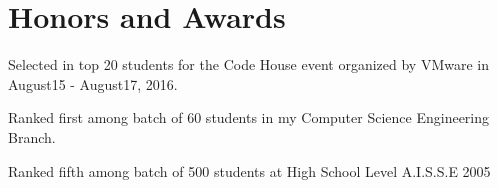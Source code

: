 \documentclass[letterpaper,10.8pt]{article}
\begin{document}
\section{Honors and Awards}
\begin{description}[font=$\bullet$]
\item {Selected in top 20 students for the Code House event organized by VMware in August15 - August17, 2016.} 
\item {Ranked first among batch of 60 students in my Computer Science Engineering Branch.}
\item {Ranked fifth among batch of 500 students at High School Level A.I.S.S.E 2005}
\end{description}
\end{document}
